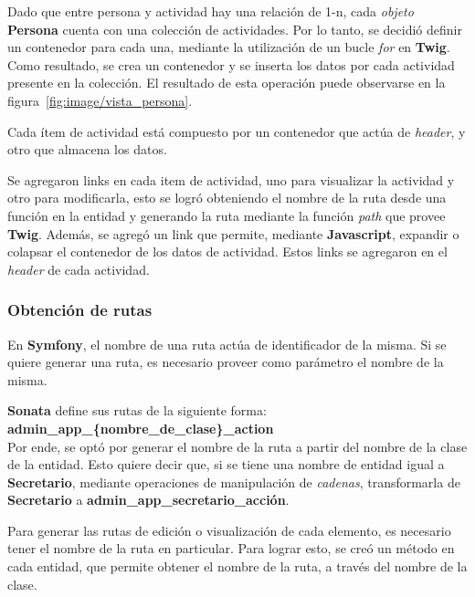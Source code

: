 Dado que entre persona y actividad hay una relación de 1-n, cada \textit{objeto} \textbf{Persona} cuenta con una colección de actividades\@. Por lo tanto, se decidió definir un contenedor para cada una,
mediante la utilización de un bucle \textit{for} en \textbf{Twig}. Como resultado, se crea un contenedor y se inserta los datos por cada actividad presente en la colección\@. El resultado de esta
operación puede observarse en la figura~\ref{fig:image/vista_persona}\@.


Cada ítem de actividad está compuesto por un contenedor que actúa de \textit{header}, y otro que almacena los datos\@.




Se agregaron links en cada item de actividad, uno para visualizar la actividad y otro para modificarla, esto se logró obteniendo el nombre de la ruta desde una función en la entidad y generando
la ruta mediante la función
\textit{path} que provee \textbf{Twig}\@. Además, se agregó un link que permite, mediante \textbf{Javascript}, expandir o colapsar el contenedor de los datos de actividad\@. Estos links se agregaron en
el \textit{header} de cada actividad\@.

\subsubsection{Obtención de rutas}%
\label{ssub:obtención_de_rutas}
En \textbf{Symfony}, el nombre de una ruta actúa de identificador de la misma\@. Si se quiere generar una ruta, es necesario proveer como parámetro el nombre de la misma.


\textbf{Sonata} define sus rutas de la siguiente forma: \\

\textbf{admin\_app\_\{nombre\_de\_clase\}\_action} \\

Por ende, se optó por generar el nombre de la ruta a partir del nombre de la clase de la entidad. Esto quiere decir que, si se tiene una nombre de entidad igual a \textbf{Secretario}, mediante
operaciones de
manipulación de \textit{cadenas}, transformarla de \textbf{Secretario} a \textbf{admin\_app\_secretario\_acción}\@.



Para generar las rutas de edición o visualización de cada elemento, es necesario tener el nombre de la ruta en particular. Para lograr esto, se creó un método en cada entidad, que permite obtener el
nombre de la ruta, a través del nombre de la clase.






